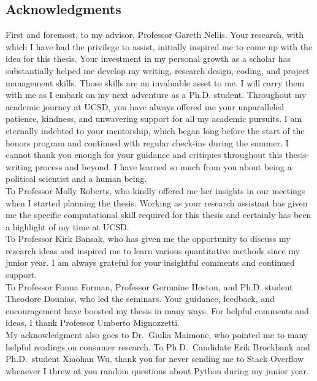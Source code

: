 \documentclass[letterpaper, 12pt]{article}
\begin{document}
\begin{titlepage}
\section*{Acknowledgments}
First and foremost, to my advisor, Professor Gareth Nellis. Your research, with which I have had the privilege to assist, initially inspired me to come up with the idea for this thesis. Your investment in my personal growth as a scholar has substantially helped me develop my writing, research design, coding, and project management skills. Those skills are an invaluable asset to me. I will carry them with me as I embark on my next adventure as a Ph.D. student. Throughout my academic journey at UCSD, you have always offered me your unparalleled patience, kindness, and unwavering support for all my academic pursuits. I am eternally indebted to your mentorship, which began long before the start of the honors program and continued with regular check-ins during the summer. I cannot thank you enough for your guidance and critiques throughout this thesis-writing process and beyond. I have learned so much from you about being a political scientist and a human being. \\

To Professor Molly Roberts, who kindly offered me her insights in our meetings when I started planning the thesis. Working as your research assistant has given me the specific computational skill required for this thesis and certainly has been a highlight of my time at UCSD. \\

To Professor Kirk Bansak, who has given me the opportunity to discuss my research ideas and inspired me to learn various quantitative methods since my junior year. I am always grateful for your insightful comments and continued support. \\

To Professor Fonna Forman, Professor Germaine Hoston, and Ph.D. student Theodore Dounias, who led the seminars. Your guidance, feedback, and encouragement have boosted my thesis in many ways. For helpful comments and ideas, I thank Professor Umberto Mignozzetti.\\

My acknowledgment also goes to Dr.\ Giulia Maimone, who pointed me to many helpful readings on consumer research. To Ph.D.\ Candidate Erik Brockbank and Ph.D.\ student Xiaohan Wu, thank you for never sending me to Stack Overflow whenever I threw at you random questions about Python during my junior year. \\


\end{titlepage}
\end{document}
